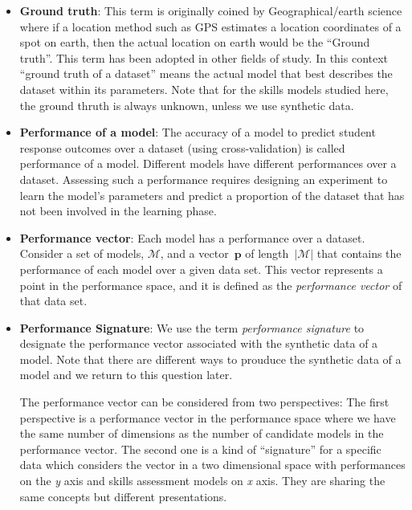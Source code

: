 \begin{itemize}
\item \textbf{Ground truth}: This term is originally coined by Geographical/earth science where if a location method such as GPS estimates a location coordinates of a spot on earth, then the actual location on earth would be the ``Ground truth''. This term has been adopted in other fields of study. In this context ``ground truth of a dataset'' means the actual model that best describes the dataset within its parameters.  Note that for the skills models studied here, the ground thruth is always unknown, unless we use synthetic data.
\item \textbf{Performance of a model}: The accuracy of a model to predict student response outcomes over a dataset (using cross-validation) is called performance of a model.  Different models have different performances over a dataset. Assessing such a performance requires designing an experiment to learn the model's parameters and predict a proportion of the dataset that has not been involved in the learning phase.
\item \textbf{Performance vector}: Each model has a performance over a dataset. Consider a set of models, $\mathcal{M}$, and a vector~$\mathbf{p}$ of length~$|\mathcal{M}|$ that contains the performance of each model over a given data set.  This vector represents a point in the performance space, and it is defined as the \textit{performance vector} of that data set.
\item \textbf{Performance Signature}: We use the term \textit{performance signature} to designate the performance vector associated with the synthetic data of a model.  Note that there are different ways to prouduce the synthetic data of a model and we return to this question later.

The performance vector can be considered from two perspectives: The first perspective is a performance vector in the performance space where we have the same number of dimensions as the number of candidate models in the performance vector. The second one is a kind of ``signature'' for a specific data which considers the vector in a two dimensional space with performances on the \textit{y} axis and skills assessment models on \textit{x} axis.  They are sharing the same concepts but different presentations. 




\end{itemize}

